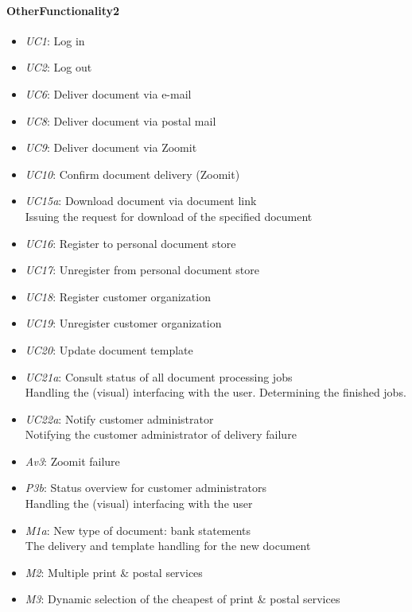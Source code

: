 \documentclass[a4paper,10pt]{article}
\begin{document}
\paragraph{OtherFunctionality2}
\begin{itemize}
    \item \emph{UC1}: Log in
    \item \emph{UC2}: Log out
    \item \emph{UC6}: Deliver document via e-mail
    \item \emph{UC8}: Deliver document via postal mail
    \item \emph{UC9}: Deliver document via Zoomit
    \item \emph{UC10}: Confirm document delivery (Zoomit)
    \item \emph{UC15a}: Download document via document link\\
    Issuing the request for download of the specified document
    \item \emph{UC16}: Register to personal document store
    \item \emph{UC17}: Unregister from personal document store
    \item \emph{UC18}: Register customer organization
    \item \emph{UC19}: Unregister customer organization
    \item \emph{UC20}: Update document template
    \item \emph{UC21a}: Consult status of all document processing jobs\\
    Handling the (visual) interfacing with the user. Determining the finished jobs.
    \item \emph{UC22a}: Notify customer administrator\\
    Notifying the customer administrator of delivery failure
    \item \emph{Av3}: Zoomit failure
    \item \emph{P3b}: Status overview for customer administrators\\
    Handling the (visual) interfacing with the user
    \item \emph{M1a}: New type of document: bank statements\\
    The delivery and template handling for the new document
    \item \emph{M2}: Multiple print \& postal services
    \item \emph{M3}: Dynamic selection of the cheapest of print \& postal services
\end{itemize}
\end{document}
